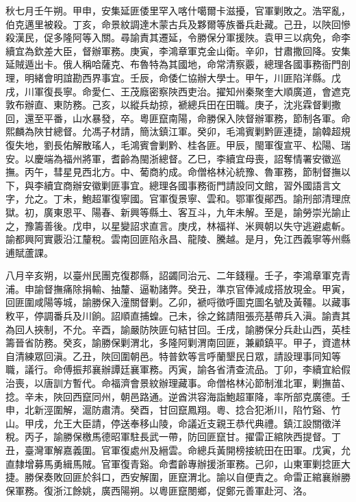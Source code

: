 \begin{pinyinscope}
秋七月壬午朔。甲申，安集延匪倭里罕入喀什噶爾卡滋擾，官軍剿敗之。浩罕亂，伯克邁里被殺。丁亥，命景紋調達木蒙古兵及夥爾等族番兵赴藏。己丑，以陜回慘殺漢民，促多隆阿等入關。尋諭責其遷延，令勝保分軍援陜。袁甲三以病免，命李續宜為欽差大臣，督辦軍務。庚寅，李鴻章軍克金山衛。辛卯，甘肅撒回降。安集延賊遁出卡。俄人稱哈薩克、布魯特為其國地，命常清察覈，總理各國事務衙門剖理，明緒會明誼勘西界事宜。壬辰，命倭仁協辦大學士。甲午，川匪陷洋縣。戊戌，川軍復長寧。命愛仁、王茂廕密察陜西吏治。擢知州秦聚奎大順廣道，會遮克敦布辦直、東防務。己亥，以縱兵劫掠，褫總兵田在田職。庚子，沈兆霖督剿撒回，還至平番，山水暴發，卒。粵匪竄南陽，命勝保入陜督辦軍務，節制各軍。命熙麟為陜甘總督。允馮子材請，簡汰鎮江軍。癸卯，毛鴻賓剿黔匪連捷，諭韓超規復失地，劉長佑解散瑤人，毛鴻賓會剿黔、桂各匪。甲辰，閩軍復宣平、松陽、瑞安。以慶端為福州將軍，耆齡為閩浙總督。乙巳，李續宜母喪，詔奪情署安徽巡撫。丙午，彗星見西北方。中、葡商約成。命僧格林沁統豫、魯軍務，節制督撫以下，與李續宜商辦安徽剿匪事宜。總理各國事務衙門請設同文館，習外國語言文字，允之。丁未，鮑超軍復寧國。官軍復景寧、雲和。鄂軍復鄖西。諭刑部清理庶獄。初，廣東恩平、陽春、新興等縣土、客互斗，九年未解。至是，諭勞崇光諭止之，豫籌善後。戊申，以星變詔求直言。庚戌，林福祥、米興朝以失守逃避處斬。諭都興阿實覈沿江釐稅。雲南回匪陷永昌、龍陵、騰越。是月，免江西義寧等州縣逋賦蘆課。

八月辛亥朔，以臺州民團克復郡縣，詔蠲同治元、二年錢糧。壬子，李鴻章軍克青浦。申諭督撫痛除捐輸、抽釐、逼勒諸弊。癸丑，準京官俸減成搭放現金。甲寅，回匪圍咸陽等城，諭勝保入潼關督剿。乙卯，褫哷徵呼圖克圖名號及黃韁。以藏事敉平，停調番兵及川餉。詔順直捕蝗。己未，徐之銘請阻張亮基帶兵入滇。諭責其為回人挾制，不允。辛酉，諭嚴防陜匪句結甘回。壬戌，諭勝保分兵赴山西，英桂籌晉省防務。癸亥，諭勝保剿渭北，多隆阿剿渭南回匪，兼顧鎮平。甲子，資遣林自清練眾回滇。乙丑，陜回圍朝邑。特普欽等言呼蘭墾民日眾，請設理事同知等職，議行。命傅振邦襄辦譚廷襄軍務。丙寅，諭各省清查流品。丁卯，李續宜給假治喪，以唐訓方暫代。命福濟會景紋辦理藏事。命僧格林沁節制淮北軍，剿撫苗、捻。辛未，陜回西竄同州，朝邑路通。逆酋洪容海詣鮑超軍降，率所部克廣德。壬申，北新涇圍解，滬防肅清。癸酉，甘回竄鳳翔。粵、捻合犯淅川，陷竹谿、竹山。甲戌，允王大臣請，停送奉移山陵，命議近支親王恭代典禮。鎮江設關徵洋稅。丙子，諭勝保檄馬德昭軍駐長武一帶，防回匪竄甘。擢雷正綰陜西提督。丁丑，臺灣軍解嘉義圍。官軍復處州及縉雲。命總兵黃開榜接統田在田軍。戊寅，允直隸增募馬勇緝馬賊。官軍復青谿。命耆齡專辦援浙軍務。己卯，山東軍剿捻匪大捷。勝保奏敗回匪於斜口，西安解圍，匪竄渭北。諭以自便責之。命雷正綰襄辦勝保軍務。復浙江餘姚，廣西陽朔。以粵匪竄閿鄉，促鄭元善軍赴河、洛。


\end{pinyinscope}
